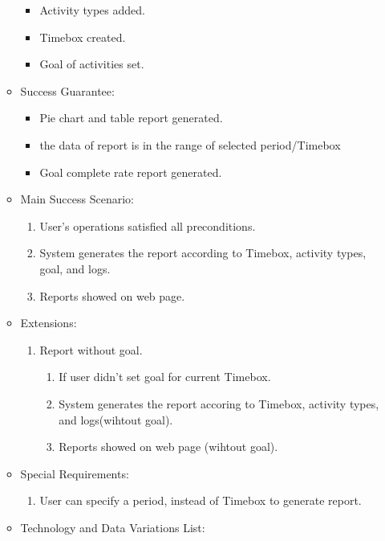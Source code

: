 \documentclass[12pt, a4paper]{article}
\begin{document}
\begin{CJK*}{UTF8}{bkai}
\begin{enumerate}
\begin{itemize}
\begin{itemize}
              \item Activity types added.
              \item Timebox created.
              \item Goal of activities set.
            \end{itemize}
          \item Success Guarantee:
            \begin{itemize}
              \item Pie chart and table report generated.
              \item the data of report is in the range of selected period/Timebox
              \item Goal complete rate report generated.
            \end{itemize}
          \item Main Success Scenario:
            \begin{enumerate}
              \item User's operations satisfied all preconditions.
              \item System generates the report according to Timebox, activity types, goal, and logs.
              \item Reports showed on web page.
            \end{enumerate}
          \item Extensions:
            \begin{enumerate}
              \item Report without goal.
                \begin{enumerate}
                  \item If user didn't set goal for current Timebox.
                  \item System generates the report accoring to Timebox, activity types, and logs(wihtout goal).
                  \item Reports showed on web page (wihtout goal).
                \end{enumerate}
            \end{enumerate}
          \item Special Requirements:
            \begin{enumerate}
              \item User can specify a period, instead of Timebox to generate report.
            \end{enumerate}
          \item Technology and Data Variations List:

\end{itemize}
\end{enumerate}
\end{CJK*}
\end{document}

